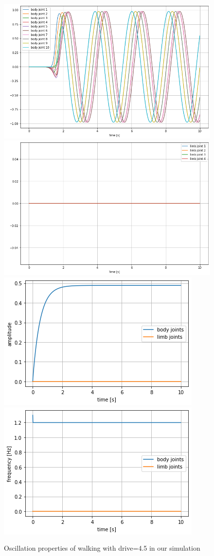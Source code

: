 \documentclass{cmc}
\begin{document}
\begin{figure}[H]
\centering
\includegraphics[height=0.3\columnwidth]{figures/8a_d45_spine.png}
\includegraphics[height=0.3\columnwidth]{figures/8a_d45_limb.png}
\includegraphics[height=0.3\columnwidth]{figures/8a_d45_amp.png}
\includegraphics[height=0.3\columnwidth]{figures/8a_d45_freq.png}
\caption{Oscillation properties of walking with drive=4.5 in our simulation}
\label{a4}
\end{figure}
\end{document}
